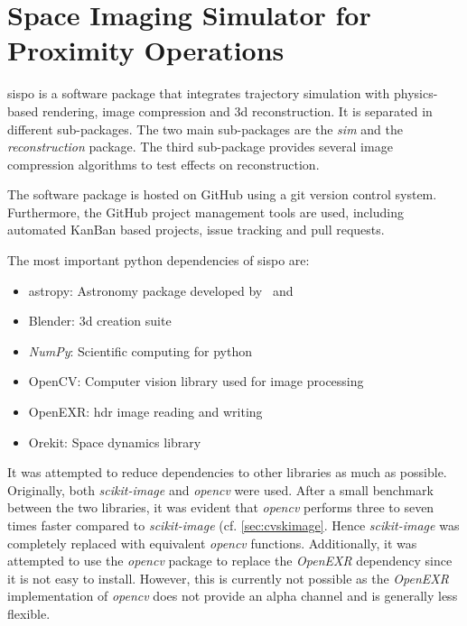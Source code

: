 \section{Space Imaging Simulator for Proximity Operations} \label{sec:sispo}
\gls{sispo} is a software package that integrates trajectory simulation with physics-based rendering, image compression and \gls{3d} reconstruction. It is separated in different sub-packages. The two main sub-packages are the \textit{sim} and the \textit{reconstruction} package. The third sub-package provides several image compression algorithms to test effects on reconstruction.

The software package is hosted on GitHub using a git version control system. Furthermore, the GitHub project management tools are used, including automated KanBan based projects, issue tracking and pull requests.

The most important python dependencies of \gls{sispo} are:
\begin{itemize}
    \item astropy: Astronomy package developed by~\cite{robitaille2013astropy} and~\cite{price2018astropy}
    \item Blender: \gls{3d} creation suite~\cite{blender}
    \item \textit{NumPy}: Scientific computing for python~\cite{oliphant2006guideNumPy}
    \item OpenCV: Computer vision library used for image processing~\cite{opencv_library}
    \item OpenEXR: \gls{hdr} image reading and writing~\cite{openexr}
    \item Orekit: Space dynamics library~\cite{orekit}
\end{itemize}

It was attempted to reduce dependencies to other libraries as much as possible. Originally, both \textit{scikit-image} and \textit{opencv} were used. After a small benchmark between the two libraries, it was evident that \textit{opencv} performs three to seven times faster compared to \textit{scikit-image} (cf. \ref{sec:cvskimage}. Hence \textit{scikit-image} was completely replaced with equivalent \textit{opencv} functions. Additionally, it was attempted to use the \textit{opencv} package to replace the \textit{OpenEXR} dependency since it is not easy to install. However, this is currently not possible as the \textit{OpenEXR} implementation of \textit{opencv} does not provide an alpha channel and is generally less flexible.

